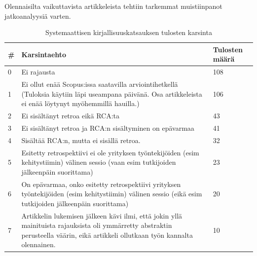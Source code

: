 Olennaisilta vaikuttavista artikkeleista tehtiin tarkemmat muistiinpanot jatkoanalyysiä varten.

\begin{table}
    \begin{tabular}{|p{0.5cm}|p{11.5cm}|p{2cm}|}
        \hline
        \textbf{\#} & \textbf{Karsintaehto} & \textbf{Tulosten määrä} \\ \hline
        0 & Ei rajausta                                                                                                                                               & 108            \\ \hline
        1 & Ei ollut enää Scopus:issa saatavilla arviointihetkellä (Tuloksia käytiin läpi useampana päivänä. Osa artikkeleista ei enää löytynyt myöhemmillä hauilla.) & 106            \\ \hline
        2 & Ei sisältänyt retroa eikä RCA:ta                                                                                                                          & 43             \\ \hline
        3 & Ei sisältänyt retroa ja RCA:n sisältyminen on epävarmaa                                                                                                   & 41             \\ \hline
        4 & Sisältää RCA:n, mutta ei sisällä retroa.                                                                                                                  & 32             \\ \hline
        5 & Esitetty retrospektiivi ei ole yrityksen työntekijöiden (esim kehitystiimin) välinen sessio (vaan esim tutkijoiden jälkeenpäin suorittama)                & 23             \\ \hline
        6 & On epävarmaa, onko esitetty retrospektiivi yrityksen työntekijöiden (esim kehitystiimin) välinen sessio (eikä esim tutkijoiden jälkeenpäin suorittama)    & 20             \\
        \hline
        7 & Artikkelin lukemisen jälkeen kävi ilmi, että jokin yllä mainituista rajauksista oli ymmärretty abstraktin perusteella väärin, eikä artikkeli ollutkaan työn kannalta olennainen. & 10 \\ \hline
    \end{tabular}
    \caption{Systemaattisen kirjallisuuskatsauksen tulosten karsinta}
    \label{tab:karsintaehdot_taulukko}
\end{table}

